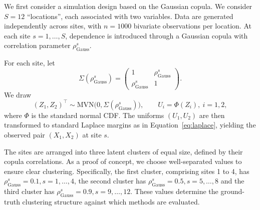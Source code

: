 \documentclass[
  12pt]{article}
\begin{document}
We first consider a simulation design based on the Gaussian copula.  
We consider $S=12$ ``locations'', each associated with two variables. 
Data are generated independently across sites, with $n=1000$ bivariate observations per location.  
At each site $s=1,\dots,S$, dependence is introduced through a Gaussian copula with correlation parameter $\rho_{\text{Gauss}}^s$.

For each site, let
\[
\Sigma(\rho_{\text{Gauss}}^s)=
\begin{pmatrix}
1 & \rho_{\text{Gauss}}^s\\[4pt]
\rho_{\text{Gauss}}^s & 1
\end{pmatrix}.
\]
We draw
\[
  (Z_{1},Z_{2})^\top \sim \mbox{MVN}\big(0,\Sigma(\rho_{\text{Gauss}}^s)\big),
\qquad
U_i=\Phi(Z_i),\ i=1,2,
\]
where $\Phi$ is the standard normal CDF.  
The uniforms $(U_1,U_2)$ are then transformed to standard Laplace margins as in Equation~\eqref{eq:laplace}, yielding the observed pair $(X_1,X_2)$ at site $s$.

The sites are arranged into three latent clusters of equal size, defined by their copula correlations. 
As a proof of concept, we choose well-separated values to ensure clear clustering.
Specifically, the first cluster, comprising sites 1 to 4, has $\rho_{\text{Gauss}}^s=0.1, s = 1, \ldots, 4$, the second cluster has $\rho_{\text{Gauss}}^s=0.5, s = 5, \ldots, 8$ 
and the third cluster has $\rho_{\text{Gauss}}^s=0.9, s = 9, \ldots, 12$.
These values determine the ground-truth clustering structure against which methods are evaluated.
\end{document}
